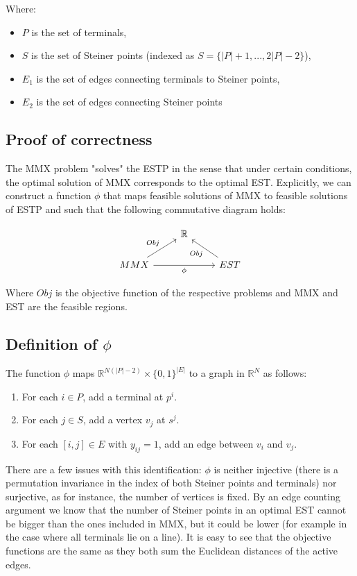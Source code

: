 \documentclass{article}
\begin{document}
    Where: \begin{itemize}
               \item $P$ is the set of terminals,
               \item $S$ is the set of Steiner points (indexed as $S = \{|P| + 1, ..., 2|P|-2\}$),
               \item $E_1$ is the set of edges connecting terminals to Steiner points,
               \item $E_2$ is the set of edges connecting Steiner points
    \end{itemize}

    \subsection{Proof of correctness}

    The MMX problem "solves" the ESTP in the sense that under certain conditions, the optimal solution of MMX corresponds to
    the optimal EST.
    Explicitly, we can construct a function $\phi$ that maps feasible solutions of MMX to feasible solutions of ESTP and such
    that the following commutative diagram holds:

    \[
        \begin{tikzcd}
            & \mathbb{R}  \\
            MMX \arrow[ur, "Obj"] \arrow[rr, "\phi"'] & & EST  \arrow[ul, "Obj"]
        \end{tikzcd}
    \]

    Where $Obj$ is the objective function of the respective problems and MMX and EST are the feasible regions.

    \subsection{Definition of $\phi$}
    The function $\phi$ maps $\mathbb{R}^{N (|P|-2)} \times \{0,1\}^{|E|}$ to a graph in $\mathbb{R}^N$ as follows:

    \begin{enumerate}
        \item For each $i \in P$, add a terminal at $p^i$.
        \item For each $j \in S$, add a vertex $v_j$ at $s^j$.
        \item For each $[i,j] \in E$ with $y_{ij} = 1$, add an edge between $v_i$ and $v_j$.
    \end{enumerate}

    There are a few issues with this identification: $\phi$ is neither injective (there is a permutation invariance in the index of both
    Steiner points and terminals) nor surjective, as for instance, the number of vertices is fixed. By an edge counting argument we know that
    the number of Steiner points in an optimal EST cannot be bigger than the ones included in MMX, but it could be lower
    (for example in the case where all terminals lie on a line).
    It is easy to see that the objective functions are the same as they both sum the Euclidean distances of the active edges.
\end{document}
